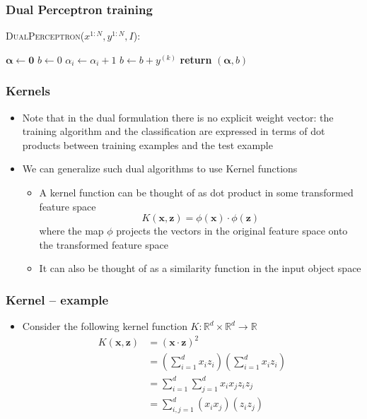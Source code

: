 \documentclass{beamer}
\newcommand{\vecb}[1]{\mathbf{#1}}
\newcommand{\x}{\mathbf{x}}
\begin{document}
\begin{frame}\frametitle{Dual Perceptron training}
 \begin{block}{\textsc{DualPerceptron}($x^{1:N},y^{1:N},I$):}
\begin{algorithmic}[1]
\STATE $\boldsymbol\alpha \leftarrow \vecb{0}$
\STATE $b \leftarrow 0$
    		\IF {$y^{(k)} \left[\sum_{i=1}^N \alpha_i y^{(i)} \x^{(i)}\cdot\x^{(k)} + b\right] \leq 0$}
        		\STATE $\alpha_i \leftarrow \alpha_i + 1$
			\STATE $b \leftarrow b + y^{(k)}$
    		\ENDIF
    	\ENDFOR
\ENDFOR
\STATE \textbf{return} $(\boldsymbol\alpha,b)$
\end{algorithmic}                 \end{block}
\end{frame}

\begin{frame}
  \frametitle{Kernels}
\begin{itemize}
\item Note that in the dual formulation there is no explicit weight
  vector: the training algorithm and the classification are expressed
  in terms of dot products between training examples and the test
  example
\item We can generalize such dual algorithms to use \alert{Kernel}
  functions
\begin{itemize}
\item A kernel function can be thought of as dot product in some
  transformed feature space
\[
 K(\x,\vecb{z}) = \phi(\x) \cdot \phi(\vecb{z})
\]
where the map $\phi$ projects the vectors in the original feature
space onto the transformed feature space
\item It can also be thought of as a similarity function in the input
  object space
\end{itemize}

\end{itemize}
\end{frame}

\begin{frame}
 \frametitle{Kernel -- example}
\begin{itemize}
\item Consider the following kernel function $K : \mathbb{R}^d \times
  \mathbb{R}^d \rightarrow \mathbb{R}$
\begin{align}
K(\x,\vecb{z})  & = (\x \cdot \vecb{z})^2\\
		& = \left(\sum_{i=1}^d x_i z_i\right) \left(\sum_{i=1}^d x_i z_i\right)\\
		& = \sum_{i=1}^d \sum_{j=1}^d x_i x_j z_i z_j\\
		& = \sum_{i,j=1}^d (x_i x_j) (z_i z_j)
\end{align}
\end{itemize}
\end{frame}
\end{document}
